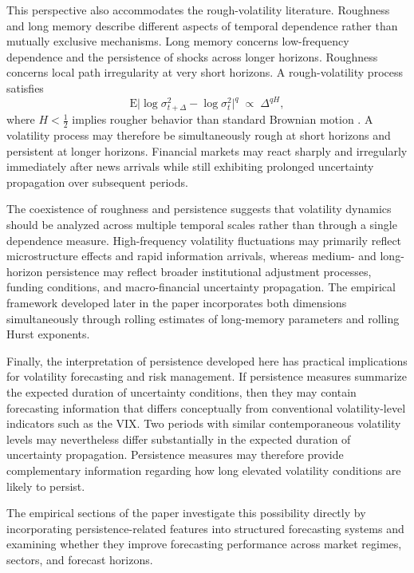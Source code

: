 \documentclass[unnumsec,webpdf,contemporary,large]{oup-authoring-template}%
\theoremstyle{thmstyleone}%
\theoremstyle{thmstyletwo}%
\theoremstyle{thmstylethree}%
\begin{document}
This perspective also accommodates the rough-volatility literature.
Roughness and long memory describe different aspects of temporal dependence
rather than mutually exclusive mechanisms. Long memory concerns
low-frequency dependence and the persistence of shocks across longer
horizons. Roughness concerns local path irregularity at very short horizons.
A rough-volatility process satisfies
\begin{equation}
  \mathrm{E}\bigl|\log\sigma^2_{t+\Delta} - \log\sigma^2_t\bigr|^q
  \;\propto\; \Delta^{qH},
  \label{eq:rough-scaling-sec3}
\end{equation}
where $H<\frac{1}{2}$ implies rougher behavior than standard Brownian motion
\citep{gatheral2018volatility}. A volatility process may therefore be
simultaneously rough at short horizons and persistent at longer horizons.
Financial markets may react sharply and irregularly immediately after news
arrivals while still exhibiting prolonged uncertainty propagation over
subsequent periods.

The coexistence of roughness and persistence suggests that volatility
dynamics should be analyzed across multiple temporal scales rather than
through a single dependence measure. High-frequency volatility fluctuations
may primarily reflect microstructure effects and rapid information arrivals,
whereas medium- and long-horizon persistence may reflect broader
institutional adjustment processes, funding conditions, and macro-financial
uncertainty propagation. The empirical framework developed later in the
paper incorporates both dimensions simultaneously through rolling estimates
of long-memory parameters and rolling Hurst exponents.

Finally, the interpretation of persistence developed here has practical
implications for volatility forecasting and risk management. If persistence
measures summarize the expected duration of uncertainty conditions, then
they may contain forecasting information that differs conceptually from
conventional volatility-level indicators such as the VIX. Two periods with
similar contemporaneous volatility levels may nevertheless differ
substantially in the expected duration of uncertainty propagation.
Persistence measures may therefore provide complementary information
regarding how long elevated volatility conditions are likely to persist.

The empirical sections of the paper investigate this possibility directly
by incorporating persistence-related features into structured forecasting
systems and examining whether they improve forecasting performance across
market regimes, sectors, and forecast horizons.
\end{document}
